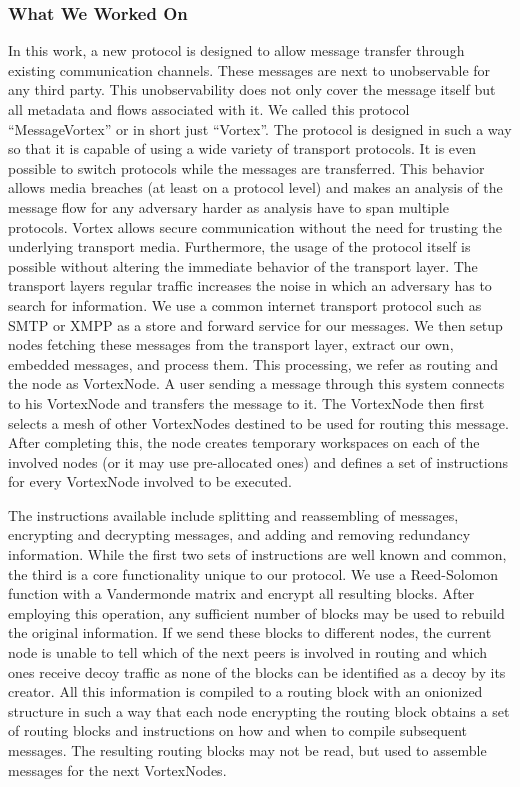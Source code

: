 \documentclass[10pt,journal,compsoc,twocolumn,twoside]{IEEEtran}
\begin{document}
\subsubsection{What We Worked On}
In this work, a new protocol is designed to allow message transfer through existing communication channels. These messages are next to unobservable for any third party. This unobservability does not only cover the message itself but all metadata and flows associated with it. We called this protocol ``MessageVortex'' or in short just ``Vortex''. The protocol is designed in such a way so that it is capable of using a wide variety of transport protocols. It is even possible to switch protocols while the messages are transferred. This behavior allows media breaches (at least on a protocol level) and makes an analysis of the message flow for any adversary harder as analysis have to span multiple protocols. Vortex allows secure communication without the need for trusting the underlying transport media. Furthermore, the usage of the protocol itself is possible without altering the immediate behavior of the transport layer. The transport layers regular traffic increases the noise in which an adversary has to search for information. We use a common internet transport protocol such as SMTP or XMPP as a store and forward service for our messages. We then setup nodes fetching these messages from the transport layer, extract our own, embedded messages, and process them. This processing, we refer as routing and the node as VortexNode. A user sending a message through this system connects to his VortexNode and transfers the message to it. The VortexNode then first selects a mesh of other VortexNodes destined to be used for routing this message. After completing this, the node creates temporary workspaces on each of the involved nodes (or it may use pre-allocated ones) and defines a set of instructions for every VortexNode involved to be executed. 

The instructions available include splitting and reassembling of messages, encrypting and decrypting messages, and adding and removing redundancy information. While the first two sets of instructions are well known and common, the third is a core functionality unique to our protocol. We use a Reed-Solomon function with a Vandermonde matrix and encrypt all resulting blocks. After employing this operation, any sufficient number of blocks may be used to rebuild the original information. If we send these blocks to different nodes, the current node is unable to tell which of the next peers is involved in routing and which ones receive decoy traffic as none of the blocks can be identified as a decoy by its creator. All this information is compiled to a routing block with an onionized structure in such a way that each node encrypting the routing block obtains a set of routing blocks and instructions on how and when to compile subsequent messages. The resulting routing blocks may not be read, but used to assemble messages for the next VortexNodes.
\end{document}
